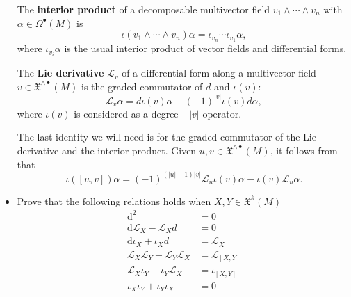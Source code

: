 \documentclass[a4paper,12pt]{scrartcl}
\newcommand{\LX}{\mathfrak{X}^{\wedge {\bullet}}}
\renewcommand{\L}{\mathcal{L}}
\renewcommand{\deg}[1]{\left \lvert #1 \right \rvert}
\newcommand{\ExtD}{\textrm{d}}
\newcommand{\Lie}{\mathcal{L}}
\providecommand{\Lie}{\mathcal{L}}%
\begin{document}
\begin{itemize}
The \textbf{interior product} of a decomposable
multivector field $v_{1} \wedge \cdots \wedge v_{n}$ with $\alpha \in \Omega^{\bullet}(M)$ is
\begin{equation} \label{interior}
\iota(v_{1} \wedge \cdots \wedge v_{n}) \alpha = \iota_{v_{n}} \cdots
\iota_{v_{1}} \alpha,
\end{equation}
where $\iota_{v_{i}} \alpha$ is the usual interior product of vector
fields and differential forms. 

The \textbf{Lie derivative} $\L_{v}$ of a differential form along a multivector field $v \in
\LX(M)$ is the graded commutator of $d$ and $\iota(v)$:
\begin{equation} \label{Lie}
\L_{v} \alpha =  d \iota(v) \alpha - (-1)^{\deg{v}} \iota(v) d\alpha,
\end{equation}
where $\iota(v)$ is considered as a degree $-\deg{v}$ operator.

The last identity we will need is for the graded commutator of
the Lie derivative and the interior product. Given $u,v \in
\LX(M)$, it follows from  \cite[Proposition A3]{Forger} that
\begin{equation} \label{commutator}
\iota([u,v]) \alpha = (-1)^{(\deg{u}-1)\deg{v}} \L_{u} \iota(v)  \alpha - \iota(v)\L_{u} \alpha.
\end{equation}
	
	\item Prove that the following relations holds when $X,Y \in \mathfrak{X}^k(M)$
				\begin{align}
					\ExtD^2 &= 0 \label{cartfirst}\\
					\ExtD \Lie_X - \Lie_X d &= 0 \\
					\ExtD \iota_X + \iota_X d &= \Lie_X \label{magic}\\
					\Lie_X \Lie_Y - \Lie_Y \Lie_X &= \Lie_{[X,Y]} \\
					\Lie_X \iota_Y - \iota_Y \Lie_X &= \iota_{[X,Y]}\\
					\iota_X \iota_Y + \iota_Y \iota_X &= 0 \label{cartlast}
				\end{align}	
	
	\end{itemize}
\end{document}
